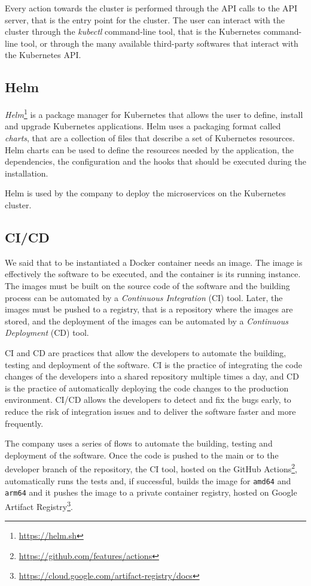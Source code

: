 Every action towards the cluster is performed through the API calls to the API server, that is the entry point for the cluster. The user can interact with the cluster through the \textit{kubectl} command-line tool, that is the Kubernetes command-line tool, or through the many available third-party softwares that interact with the Kubernetes API.

\subsection{Helm}

\textit{Helm}\footnote{\url{https://helm.sh}} is a package manager for Kubernetes that allows the user to define, install and upgrade Kubernetes applications. Helm uses a packaging format called \textit{charts}, that are a collection of files that describe a set of Kubernetes resources. Helm charts can be used to define the resources needed by the application, the dependencies, the configuration and the hooks that should be executed during the installation.

Helm is used by the company to deploy the microservices on the Kubernetes cluster.

\subsection{CI/CD}

We said that to be instantiated a Docker container needs an image. The image is effectively the software to be executed, and the container is its running instance. The images must be built on the source code of the software and the building process can be automated by a \textit{Continuous Integration} (CI) tool. Later, the images must be pushed to a registry, that is a repository where the images are stored, and the deployment of the images can be automated by a \textit{Continuous Deployment} (CD) tool.

CI and CD are practices that allow the developers to automate the building, testing and deployment of the software. CI is the practice of integrating the code changes of the developers into a shared repository multiple times a day, and CD is the practice of automatically deploying the code changes to the production environment. CI/CD allows the developers to detect and fix the bugs early, to reduce the risk of integration issues and to deliver the software faster and more frequently.

The company uses a series of flows to automate the building, testing and deployment of the software.
Once the code is pushed to the main or to the developer branch of the repository, the CI tool, hosted on the GitHub Actions\footnote{\url{https://github.com/features/actions}}, automatically runs the tests and, if successful, builds the image for \texttt{amd64} and \texttt{arm64} and it pushes the image to a private container registry, hosted on Google Artifact Registry\footnote{\url{https://cloud.google.com/artifact-registry/docs}}.

